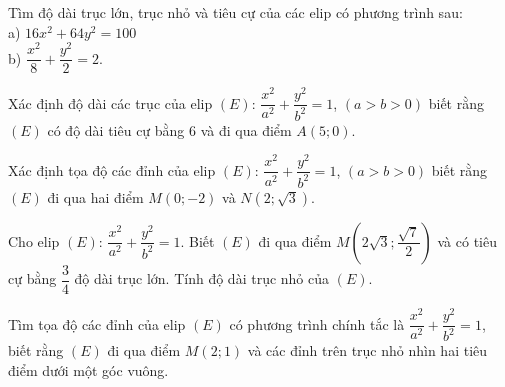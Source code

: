 \begin{bt}%
	Tìm độ dài trục lớn, trục nhỏ và tiêu cự của các elip có phương trình sau:\\
	a) $16x^2+64y^2=100$ \\
	b) $\dfrac{x^2}{8} + \dfrac{y^2}{2} = 2$.
\end{bt}

\begin{bt}%
	Xác định độ dài các trục của elip $(E)$: $\dfrac{x^2}{a^2} + \dfrac{y^2}{b^2} = 1$, $(a>b>0)$ biết rằng $(E)$ có độ dài tiêu cự bằng $6$ và đi qua điểm $A(5;0)$.
\end{bt}

\begin{bt}%
	Xác định tọa độ các đỉnh của elip $(E)$: $\dfrac{x^2}{a^2} + \dfrac{y^2}{b^2} = 1$, $(a>b>0)$ biết rằng $(E)$ đi qua hai điểm $M(0;-2)$ và $N(2;\sqrt{3})$.
\end{bt}

\begin{bt}%
	Cho elip $(E)$: $\dfrac{x^2}{a^2} + \dfrac{y^2}{b^2} = 1$. Biết $(E)$ đi qua điểm $M\left(2\sqrt{3};\dfrac{\sqrt{7}}{2}\right)$ và có tiêu cự bằng $\dfrac{3}{4}$ độ dài trục lớn. Tính độ dài trục nhỏ của $(E)$.
\end{bt}


\begin{bt}%
	Tìm tọa độ các đỉnh của elip $(E)$ có phương trình chính tắc là $\dfrac{x^2}{a^2} + \dfrac{y^2}{b^2} = 1$, biết rằng $(E)$ đi qua điểm $M(2;1)$ và các đỉnh trên trục nhỏ nhìn hai tiêu điểm dưới một góc vuông.
\end{bt}

